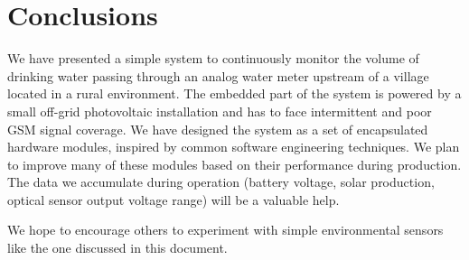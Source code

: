 \chapter{Conclusions}

We have presented a simple system to continuously monitor the volume of drinking water passing
through an analog water meter upstream of a village located in a rural environment.
The embedded part of the system is powered by a small off-grid photovoltaic installation and
has to face intermittent and poor GSM signal coverage.
We have designed the system as a set of encapsulated hardware modules, inspired by common software engineering
techniques.
We plan to improve many of these modules based on their performance during production.
The data we accumulate during operation (battery voltage, solar production,
optical sensor output voltage range) will be a valuable help.

We hope to encourage others to experiment with simple environmental sensors like the one discussed in
this document.